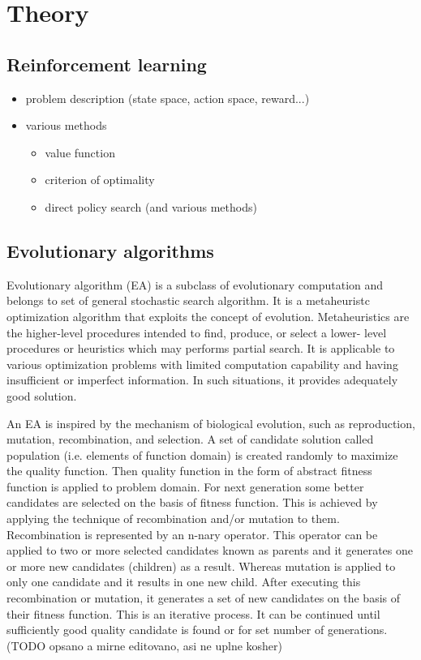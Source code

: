 \chapter{Theory}
\label{chap:theory}

\section{Reinforcement learning}
\label{sec:reinf}
\begin{itemize}
    \item problem description (state space, action space, reward...)
    \item various methods \begin{itemize}
        \item value function
        \item criterion of optimality
        \item direct policy search (and various methods)
    \end{itemize}
\end{itemize}
\section{Evolutionary algorithms}
\label{sec:ea}
Evolutionary algorithm (EA) is a subclass of evolutionary computation and belongs to set of general stochastic search algorithm. It is a metaheuristc optimization algorithm that exploits the concept of evolution. Metaheuristics are the higher-level procedures intended to find, produce, or select a lower- level procedures or heuristics which may performs partial search. It is applicable to various optimization problems with limited computation capability and having insufficient or imperfect information. In such situations, it provides adequately good solution.  

An EA is inspired by the mechanism of biological evolution, such as reproduction, mutation, recombination, and selection. A set of candidate solution called population (i.e. elements of function domain) is created randomly to maximize the quality function. Then quality function in the form of abstract fitness function is applied to problem domain. For next generation some better candidates are selected on the basis of fitness function. This is achieved by applying the technique of recombination and/or mutation to them. Recombination is represented by an n-nary operator. This operator can be applied to two or more selected candidates known as parents and it generates one or more new candidates (children) as a result. Whereas mutation is applied to only one candidate and it results in one new child. After executing this recombination or mutation, it generates a set of new candidates on the basis of their fitness function. This is an iterative process. It can be continued until sufficiently good quality candidate is found or for set number of generations. (TODO opsano a mirne editovano, asi ne uplne kosher) \cite{Vikhar2016}
